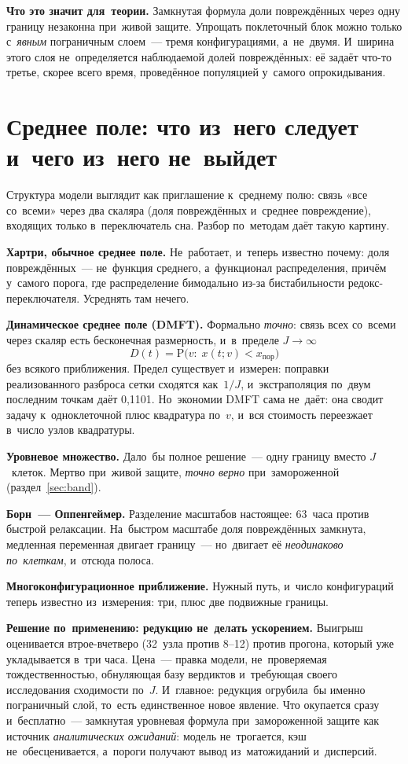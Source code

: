 \documentclass[11pt,a4paper,landscape,twocolumn]{article}
\begin{document}
\textbf{Что это значит для~теории.} Замкнутая формула доли повреждённых через одну границу незаконна при~живой защите. Упрощать поклеточный блок можно только с~\emph{явным} пограничным слоем~— тремя конфигурациями, а~не~двумя. И~ширина этого слоя не~определяется наблюдаемой долей повреждённых: её задаёт что-то третье, скорее всего время, проведённое популяцией у~самого опрокидывания.

\section{Среднее поле: что из~него следует и~чего из~него не~выйдет}\label{sec:mf}
Структура модели выглядит как приглашение к~среднему полю: связь «все со~всеми» через два скаляра (доля повреждённых и~среднее повреждение), входящих только в~переключатель сна. Разбор по~методам даёт такую картину.

\textbf{Хартри, обычное среднее поле.} Не~работает, и~теперь известно почему: доля повреждённых~— не~функция среднего, а~функционал распределения, причём у~самого порога, где распределение бимодально из-за бистабильности редокс-переключателя. Усреднять там нечего.

\textbf{Динамическое среднее поле (DMFT).} Формально \emph{точно}: связь всех со~всеми через скаляр есть бесконечная размерность, и~в~пределе $J\to\infty$
\[D(t)=\mathrm{P}\big(v:\;x(t;v)<x_{\text{пор}}\big)\]
без всякого приближения. Предел существует и~измерен: поправки реализованного разброса сетки сходятся как~$1/J$, и~экстраполяция по~двум последним точкам даёт 0,1101. Но~экономии DMFT сама не~даёт: она сводит задачу к~одноклеточной плюс квадратура по~$v$, и~вся стоимость переезжает в~число узлов квадратуры.

\textbf{Уровневое множество.} Дало~бы полное решение~— одну границу вместо $J$~клеток. Мертво при~живой защите, \emph{точно верно} при~замороженной (раздел~\ref{sec:band}).

\textbf{Борн~— Оппенгеймер.} Разделение масштабов настоящее: 63~часа против быстрой релаксации. На~быстром масштабе доля повреждённых замкнута, медленная переменная двигает границу~— но~двигает её \emph{неодинаково по~клеткам}, и~отсюда полоса.

\textbf{Многоконфигурационное приближение.} Нужный путь, и~число конфигураций теперь известно из~измерения: три, плюс две подвижные границы.

\begin{note}
\textbf{Решение по~применению: редукцию не~делать ускорением.} Выигрыш оценивается втрое-вчетверо (32~узла против 8–12) против прогона, который уже укладывается в~три часа. Цена~— правка модели, не~проверяемая тождественностью, обнуляющая базу вердиктов и~требующая своего исследования сходимости по~$J$. И~главное: редукция огрубила~бы именно пограничный слой, то~есть единственное новое явление. Что окупается сразу и~бесплатно~— замкнутая уровневая формула при~замороженной защите как источник \emph{аналитических ожиданий}: модель не~трогается, кэш не~обесценивается, а~пороги получают вывод из~матожиданий и~дисперсий.
\end{note}
\end{document}
